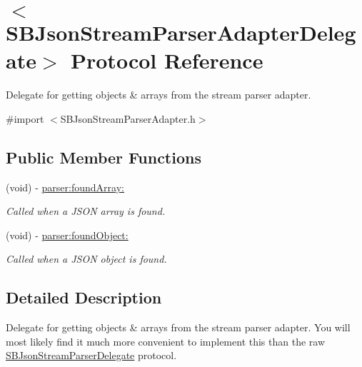 \hypertarget{protocol_s_b_json_stream_parser_adapter_delegate-p}{
\section{$<$SBJsonStreamParserAdapterDelegate$>$ Protocol Reference}
\label{protocol_s_b_json_stream_parser_adapter_delegate-p}
}


Delegate for getting objects \& arrays from the stream parser adapter.  




{\ttfamily \#import $<$SBJsonStreamParserAdapter.h$>$}

\subsection*{Public Member Functions}
\begin{DoxyCompactItemize}
\item 
\hypertarget{protocol_s_b_json_stream_parser_adapter_delegate-p_acac3b4b2e4cfb45a8ca8ca945a47e326}{
(void) -\/ \hyperlink{protocol_s_b_json_stream_parser_adapter_delegate-p_acac3b4b2e4cfb45a8ca8ca945a47e326}{parser:foundArray:}}
\label{protocol_s_b_json_stream_parser_adapter_delegate-p_acac3b4b2e4cfb45a8ca8ca945a47e326}

\begin{DoxyCompactList}\small\item\em Called when a JSON array is found. \item\end{DoxyCompactList}\item 
\hypertarget{protocol_s_b_json_stream_parser_adapter_delegate-p_abefd538a1ce6d75eb3e8572a1049f597}{
(void) -\/ \hyperlink{protocol_s_b_json_stream_parser_adapter_delegate-p_abefd538a1ce6d75eb3e8572a1049f597}{parser:foundObject:}}
\label{protocol_s_b_json_stream_parser_adapter_delegate-p_abefd538a1ce6d75eb3e8572a1049f597}

\begin{DoxyCompactList}\small\item\em Called when a JSON object is found. \item\end{DoxyCompactList}\end{DoxyCompactItemize}


\subsection{Detailed Description}
Delegate for getting objects \& arrays from the stream parser adapter. You will most likely find it much more convenient to implement this than the raw \hyperlink{protocol_s_b_json_stream_parser_delegate-p}{SBJsonStreamParserDelegate} protocol.

